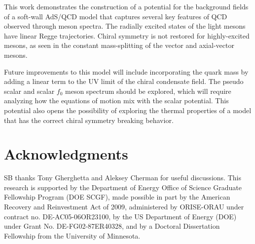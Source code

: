 \documentclass[aps,prd,12pt,nofootinbib]{revtex4}
\begin{document}
This work demonstrates the construction of a potential for the background fields of a soft-wall AdS/QCD model that captures several key features of QCD observed through meson spectra.
The radially excited states of the light mesons have linear Regge trajectories.
Chiral symmetry is not restored for highly-excited mesons, as seen in the constant mass-splitting of the vector and axial-vector mesons.

Future improvements to this model will include incorporating the quark mass by adding a linear term to the UV limit of the chiral condensate field.
The pseudo scalar and scalar $f_0$ meson spectrum should be explored, which will require analyzing how the equations of motion mix with the scalar potential.
This potential also opens the possibility of exploring the thermal properties of a model that has the correct chiral symmetry breaking behavior.


\section*{Acknowledgments}
SB thanks Tony Gherghetta and Aleksey Cherman for useful discussions.  
This research is supported by the Department of Energy Office of Science Graduate Fellowship Program (DOE SCGF), made possible in part by the American Recovery and Reinvestment Act of 2009, administered by ORISE-ORAU under contract no. DE-AC05-06OR23100, by the US Department of Energy (DOE) under Grant No. DE-FG02-87ER40328, and by a Doctoral Dissertation Fellowship from the University of Minnesota.

\vfill
\end{document}
